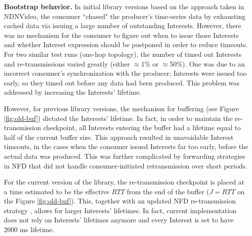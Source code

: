 \documentclass{icn/sig-alternate-2013} %
\begin{document}

%
%

\textbf{Bootstrap behavior.} In initial library versions based on the approach taken in NDNVideo, the consumer ``chased" the producer's time-series data by exhausting cached data via issuing a large number of outstanding Interests. However, there was no mechanism for the consumer to figure out when to issue those Interests and whether Interest expression should be postponed in order to reduce timeouts. For two similar test runs (one-hop topology), the number of timed out Interests and re-transmissions varied greatly (either $\approx$1\% or $\approx$50\%). One was due to an incorrect consumer's synchronization with the producer; Interests were issued too early, so they timed out before any data had been produced. This problem was addressed by increasing the Interests' lifetime. 

However, for previous library versions, the mechanism for buffering (see Figure \ref{fig:old-buf}) dictated the Interests' lifetime. In fact, in order to maintain the re-transmission checkpoint, all Interests entering the buffer had a lifetime equal to half of the current buffer size. This approach resulted in unavoidable Interest timeouts, in the cases when the consumer issued Interests far too early, before the actual data was produced.  This was further complicated by forwarding strategies in NFD that did not handle consumer-initiated retransmission over short periods. 

For the current version of the library, the re-transmission checkpoint is placed at a time estimated to be the effective $RTT$ from the end of the buffer ($J=RTT$ on the Figure \ref{fig:old-buf}). This, together with an updated NFD re-transmission strategy \cite{nfd-rtx-release}, allows for larger Interests' lifetimes. 
In fact, current implementation does not rely on Interests' lifetimes anymore and every Interest is set to have 2000 ms lifetime.
\end{document}
